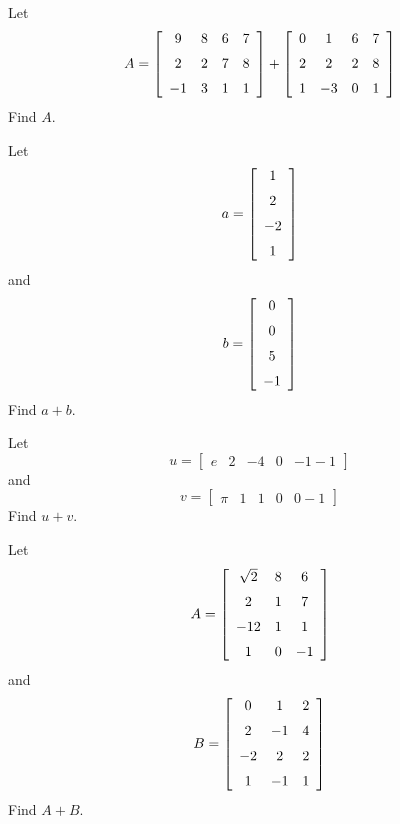 \documentclass[12pt]{amsbook}
\numberwithin{equation}{section}
\theoremstyle{plain} %
\theoremstyle{definition}
\theoremstyle{remark}
\begin{document}
\begin{Exercise}[title={A simple sum}, difficulty = 0, label = exmm]
Let
$$A =  \left[ \begin {array}{cccc} 
9  & 8  & 6 & 7 \\ \noalign{\medskip}       
2  & 2  & 7 & 8 \\ \noalign{\medskip}        
-1  & 3  & 1 & 1\end {array}
 \right] 
+
 \left[ \begin {array}{cccc} 
0  & 1  & 6 & 7 \\ \noalign{\medskip}       
2  & 2  & 2 & 8 \\ \noalign{\medskip}        
1  & -3  & 0 & 1\end {array}
 \right] 
$$
Find $A$.
\end{Exercise}



\begin{Exercise}[title={More addition}, difficulty = 0, label = exmm]
\Question 
Let
$$a =  \left[ \begin {array}{c} 
1   \\ \noalign{\medskip}       
2   \\ \noalign{\medskip}    
-2  \\ \noalign{\medskip}        
1   \end {array}
 \right] $$
and $$
b =  \left[ \begin {array}{c} 
0   \\ \noalign{\medskip} 
0    \\ \noalign{\medskip}        
5   \\ \noalign{\medskip}        
-1   \end {array}
 \right] 
$$
Find $a+b$.

\Question Let
$$u =  \left[ \begin {array}{ccccc} 
e  & 2  & -4 & 0 & -1  -1   \end {array}     
 \right] $$
and $$
v =  \left[ \begin {array}{ccccc} 
\pi  & 1  &1  &0 &0-1   \end {array}
 \right] 
$$
Find $u+v$.


\Question Let
$$A =  \left[ \begin {array}{ccc} 
\sqrt{2}  & 8  & 6  \\ \noalign{\medskip}       
2  & 1  & 7  \\ \noalign{\medskip}    
-12  & 1  & 1 \\ \noalign{\medskip}        
1  & 0  & -1 \end {array}
 \right] $$
and $$
B =  \left[ \begin {array}{cccc} 
0  & 1  & 2  \\ \noalign{\medskip} 
2  & -1  & 4  \\ \noalign{\medskip}        
-2  & 2  & 2  \\ \noalign{\medskip}        
1  & -1  & 1 \end {array}
 \right] 
$$
Find $A+B$.
\end{Exercise}
\end{document}

